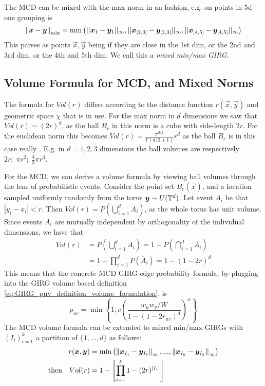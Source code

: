 The MCD can be mixed with the max norm in an  fashion, e.g. on points in 5d one grouping is
\begin{equation}
    \left\lVert \bm{x} - \bm{y}\right\rVert_\text{mix} = \min \left ( ||\bm{x}_1 - \bm{y}_{1}||_\infty, ||\bm{x}_{[2,3]} - \bm{y}_{[2,3]}||_\infty, ||\bm{x}_{[4,5]} - \bm{y}_{[4,5]}||_\infty \right )
\end{equation}
This parses as points $\vec{x}, \vec{y}$ being  if they are close in the 1st dim, or the 2nd and 3rd dim, or the 4th and 5th dim. We call this a \textit{mixed min/max GIRG}.


\subsection{Volume Formula for MCD, and Mixed Norms}
The formula for $Vol(r)$ differs according to the distance function $r(\vec{x}, \vec{y})$ and geometric space $\chi$ that is in use. For the max norm in $d$ dimensions we saw that $Vol(r) = (2r)^d$, as the ball $B_r$ in this norm is a cube with side-length $2r$. For the euclidean norm this becomes $Vol(r) = \frac{\pi^{d/2}}{\Gamma(d/2 + 1)} r^d$ as the ball $B_r$ is in this case really . E.g. in $d=1,2,3$ dimensions the ball volumes are respectively $2r;\; \pi r^2;\; \frac{4}{3} \pi r^3$.

For the MCD, we can derive a volume formula by viewing ball volumes through the lens of probabilistic events. Consider the point set $B_r(\vec{x})$, and a location sampled uniformly randomly from the torus $\bm{y} \sim U(\mathbb{T}^d)$.
Let event $A_i$ be that $|y_i - x_i| < r$.
Then $Vol(r) = P(\bigcup_{i=1}^d A_i)$, as the whole torus has unit volume.
Since events $A_i$ are mutually independent by orthogonality of the individual dimensions,
we have that
\begin{align}
    Vol(r) & = P \left (\bigcup_{i=1}^d A_i \right ) 
    = 1 - P \left ( \bigcap_{i=1}^d \overline{A}_i \right )
    \\
    &= 1 - \prod_{i=1}^d P(\overline{A}_i) = 1 - (1 - 2r)^d
    \label{eq:MCD_volume_formula}
\end{align}
This means that the concrete MCD GIRG edge probability formula, by plugging into the GIRG volume based definition \cref{eq:GIRG_puv_definition_volume_formulation}, is
\begin{equation}
    p_{uv} = \min \left \{
        1, c \left ( 
            \frac{w_u w_v / W}{1 - (1 - 2 r_{uv})^d}
        \right )^\alpha     
    \right \}
    \label{eq:MCD_GIRG_puv_definition}
\end{equation}
The MCD volume formula can be extended to mixed min/max GIRGs with $(I_i)_{i=1}^k$ a partition of $\{1, ..., d\}$ as follows:
\begin{align}
    r(\bm{x}, \bm{y}) &= \min \left ( \left\lVert \bm{x}_{I_1} - \bm{y}_{I_1}\right\rVert_\infty, ..., \left\lVert \bm{x}_{I_k} - \bm{y}_{I_k}\right\rVert_\infty  \right )
    \\
    \text{then}\quad Vol(r) &= 1 -  \left [ \prod_{i=1}^k 1 - (2r)^{|I_i|} \right ]
\end{align}

